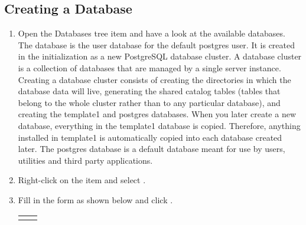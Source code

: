 \documentclass[a4paper,11pt,english]{sphinxmanual}
\begin{document}
\subsection{Creating a Database}
\label{\detokenize{setup:creating-a-database}}\begin{enumerate}
\def\theenumi{\arabic{enumi}}
\def\labelenumi{\theenumi .}
\makeatletter\def\p@enumii{\p@enumi \theenumi .}\makeatother
\item {} 
Open the Databases tree item and have a look at the available databases.  The  database is the user database for the default postgres user. It is created in the initialization  as a new PostgreSQL database cluster. A database cluster is a collection of databases that are managed by a single server instance. Creating a database cluster consists of creating the directories in which the database data will live, generating the shared catalog tables (tables that belong to the whole cluster rather than to any particular database), and creating the template1 and postgres databases. When you later create a new database, everything in the template1 database is copied. Therefore, anything installed in template1 is automatically copied into each database created later. The postgres database is a default database meant for use by users, utilities and third party applications.

\item {} 
Right-click on the  item and select .

\noindent{}

\item {} 
Fill in the  form as shown below and click .


\begin{savenotes}\sphinxattablestart
\centering
\begin{tabulary}{\linewidth}[t]{|T|T|}
\hline

&
\\
\hline
{}
&
\\
\hline
\end{tabulary}
\par
\sphinxattableend\end{savenotes}


\end{enumerate}
\end{document}
